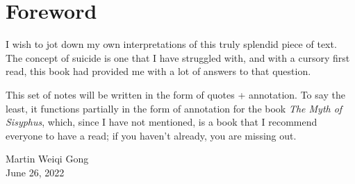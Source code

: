\chapter*{Foreword}

I wish to jot down my own interpretations of this truly splendid piece of text. The concept of suicide is one that I have struggled with, and with a cursory first read, this book had provided me with a lot of answers to that question.

This set of notes will be written in the form of quotes + annotation. To say the least, it functions partially in the form of annotation for the book \textit{The Myth of Sisyphus}, which, since I have not mentioned, is a book that I recommend everyone to have a read; if you haven't already, you are missing out.

\begin{flushright}
    Martin Weiqi Gong\\
    June 26, 2022
\end{flushright}